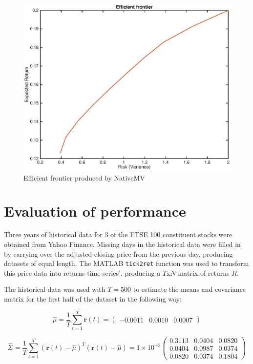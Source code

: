 \documentclass[a4paper, 12pt]{article}
\begin{document}
	\begin{figure}
		\begin{center}
			\includegraphics[width=0.75\linewidth]{figures/p1d.eps}
		\end{center}
		\caption{Efficient frontier produced by NativeMV}
		\label{fig:p1d}
	\end{figure}

	\section{Evaluation of performance}

	Three years of historical data for 3 of the FTSE 100 constituent stocks were obtained from Yahoo Finance. Missing days in the historical data were filled in by carrying over the adjusted closing price from the previous day, producing datasets of equal length. The MATLAB \texttt{tick2ret} function was used to transform this price data into returns time series', producing a $T$x$N$ matrix of returns $R$.

	The historical data was used with $T = 500$ to estimate the means and covariance matrix for the first half of the dataset in the following way:

	\[
		\hat{\mu} = \frac{1}{T} \sum_{t=1}^T \mathbf{r}(t) = \begin{pmatrix}
			-0.0011 & 0.0010 & 0.0007
		\end{pmatrix}
	\]

	\[
		\hat{\Sigma} = \frac{1}{T} \sum_{t=1}^T (\mathbf{r}(t) - \hat{\mu})^T (\mathbf{r}(t) - \hat{\mu}) = 1 \times 10^{-3} \begin{pmatrix}
			0.3113 & 0.0404 & 0.0820 \\
			0.0404 & 0.0987 & 0.0374 \\
			0.0820 & 0.0374 & 0.1804
		\end{pmatrix}
	\]
\end{document}
